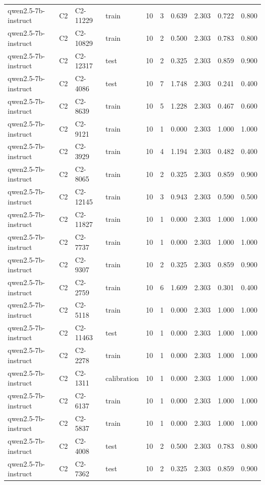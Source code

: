 \begin{table}
\begin{tabular}{llllrrrrrr}
qwen2.5-7b-instruct & C2 & C2-11229 & train & 10 & 3 & 0.639 & 2.303 & 0.722 & 0.800 \\
qwen2.5-7b-instruct & C2 & C2-10829 & train & 10 & 2 & 0.500 & 2.303 & 0.783 & 0.800 \\
qwen2.5-7b-instruct & C2 & C2-12317 & test & 10 & 2 & 0.325 & 2.303 & 0.859 & 0.900 \\
qwen2.5-7b-instruct & C2 & C2-4086 & test & 10 & 7 & 1.748 & 2.303 & 0.241 & 0.400 \\
qwen2.5-7b-instruct & C2 & C2-8639 & train & 10 & 5 & 1.228 & 2.303 & 0.467 & 0.600 \\
qwen2.5-7b-instruct & C2 & C2-9121 & train & 10 & 1 & 0.000 & 2.303 & 1.000 & 1.000 \\
qwen2.5-7b-instruct & C2 & C2-3929 & train & 10 & 4 & 1.194 & 2.303 & 0.482 & 0.400 \\
qwen2.5-7b-instruct & C2 & C2-8065 & train & 10 & 2 & 0.325 & 2.303 & 0.859 & 0.900 \\
qwen2.5-7b-instruct & C2 & C2-12145 & train & 10 & 3 & 0.943 & 2.303 & 0.590 & 0.500 \\
qwen2.5-7b-instruct & C2 & C2-11827 & train & 10 & 1 & 0.000 & 2.303 & 1.000 & 1.000 \\
qwen2.5-7b-instruct & C2 & C2-7737 & train & 10 & 1 & 0.000 & 2.303 & 1.000 & 1.000 \\
qwen2.5-7b-instruct & C2 & C2-9307 & train & 10 & 2 & 0.325 & 2.303 & 0.859 & 0.900 \\
qwen2.5-7b-instruct & C2 & C2-2759 & train & 10 & 6 & 1.609 & 2.303 & 0.301 & 0.400 \\
qwen2.5-7b-instruct & C2 & C2-5118 & train & 10 & 1 & 0.000 & 2.303 & 1.000 & 1.000 \\
qwen2.5-7b-instruct & C2 & C2-11463 & test & 10 & 1 & 0.000 & 2.303 & 1.000 & 1.000 \\
qwen2.5-7b-instruct & C2 & C2-2278 & train & 10 & 1 & 0.000 & 2.303 & 1.000 & 1.000 \\
qwen2.5-7b-instruct & C2 & C2-1311 & calibration & 10 & 1 & 0.000 & 2.303 & 1.000 & 1.000 \\
qwen2.5-7b-instruct & C2 & C2-6137 & train & 10 & 1 & 0.000 & 2.303 & 1.000 & 1.000 \\
qwen2.5-7b-instruct & C2 & C2-5837 & train & 10 & 1 & 0.000 & 2.303 & 1.000 & 1.000 \\
qwen2.5-7b-instruct & C2 & C2-4008 & test & 10 & 2 & 0.500 & 2.303 & 0.783 & 0.800 \\
qwen2.5-7b-instruct & C2 & C2-7362 & test & 10 & 2 & 0.325 & 2.303 & 0.859 & 0.900 \\

\end{tabular}
\end{table}
